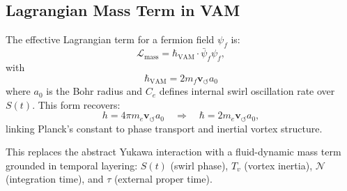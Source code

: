 \subsection{Lagrangian Mass Term in VAM}

The effective Lagrangian term for a fermion field $\psi_f$ is:
\begin{equation}
    \mathcal{L}_\text{mass} = \hbar_{\text{VAM}} \cdot \bar{\psi}_f \psi_f,
\end{equation}
with
\begin{equation}
    \boxed{ \hbar_{\text{VAM}} = 2 m_f \mathbf{v}_{\scriptscriptstyle\boldsymbol{\circlearrowleft}} a_0 }
\end{equation}
where $a_0$ is the Bohr radius and $C_e$ defines internal swirl oscillation rate over $S(t)$. This form recovers:
\[
    h = 4\pi m_e \mathbf{v}_{\scriptscriptstyle\boldsymbol{\circlearrowleft}} a_0 \quad \Rightarrow \quad \hbar = 2 m_e \mathbf{v}_{\scriptscriptstyle\boldsymbol{\circlearrowleft}} a_0,
\]
linking Planck's constant to phase transport and inertial vortex structure.

This replaces the abstract Yukawa interaction with a fluid-dynamic mass term grounded in temporal layering: $S(t)$ (swirl phase), $T_v$ (vortex inertia), $\mathcal{N}$ (integration time), and $\tau$ (external proper time).
